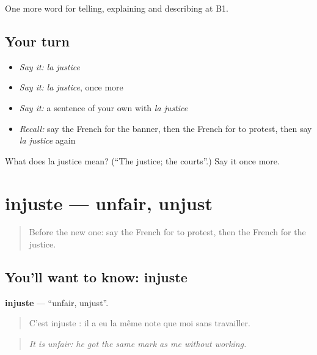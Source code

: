 \begin{grammarlens}[title={What you've built}]
One more word for telling, explaining and describing at B1.
\end{grammarlens}

\subsection*{Your turn}
\begin{itemize}
\raggedright
  \item \emph{Say it:} \emph{la justice}
  \item \emph{Say it:} \emph{la justice}, once more
  \item \emph{Say it:} a sentence of your own with \emph{la justice}
  \item \emph{Recall:} say the French for the banner, then the French for to protest, then say \emph{la justice} again
\end{itemize}

\begin{tcolorbox}[breakable,colback=teal!4,colframe=teal!35!black,title={Before you move on}]
What does la justice mean? (\textquotedblleft{}The justice; the courts\textquotedblright{}.) Say it once more.
\end{tcolorbox}
\section[injuste]{injuste — unfair, unjust}

\label{lesson:FR-C364-injuste}



\begin{quote}
Before the new one: say the French for to protest, then the French for the justice.
\end{quote}

\subsection*{You'll want to know: injuste}
\textbf{injuste} — \textquotedblleft{}unfair, unjust\textquotedblright{}.

\begin{quote}
C'est injuste : il a eu la même note que moi sans travailler.
\end{quote}

\begin{quote}
\emph{It is unfair: he got the same mark as me without working.}
\end{quote}

